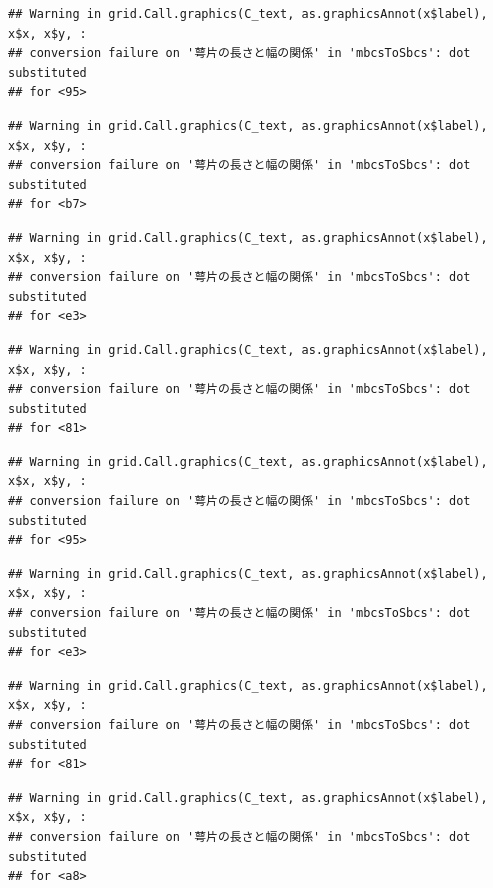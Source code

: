 \documentclass[
]{book}
\begin{document}
\begin{verbatim}
## Warning in grid.Call.graphics(C_text, as.graphicsAnnot(x$label), x$x, x$y, :
## conversion failure on '萼片の長さと幅の関係' in 'mbcsToSbcs': dot substituted
## for <95>
\end{verbatim}

\begin{verbatim}
## Warning in grid.Call.graphics(C_text, as.graphicsAnnot(x$label), x$x, x$y, :
## conversion failure on '萼片の長さと幅の関係' in 'mbcsToSbcs': dot substituted
## for <b7>
\end{verbatim}

\begin{verbatim}
## Warning in grid.Call.graphics(C_text, as.graphicsAnnot(x$label), x$x, x$y, :
## conversion failure on '萼片の長さと幅の関係' in 'mbcsToSbcs': dot substituted
## for <e3>
\end{verbatim}

\begin{verbatim}
## Warning in grid.Call.graphics(C_text, as.graphicsAnnot(x$label), x$x, x$y, :
## conversion failure on '萼片の長さと幅の関係' in 'mbcsToSbcs': dot substituted
## for <81>
\end{verbatim}

\begin{verbatim}
## Warning in grid.Call.graphics(C_text, as.graphicsAnnot(x$label), x$x, x$y, :
## conversion failure on '萼片の長さと幅の関係' in 'mbcsToSbcs': dot substituted
## for <95>
\end{verbatim}

\begin{verbatim}
## Warning in grid.Call.graphics(C_text, as.graphicsAnnot(x$label), x$x, x$y, :
## conversion failure on '萼片の長さと幅の関係' in 'mbcsToSbcs': dot substituted
## for <e3>
\end{verbatim}

\begin{verbatim}
## Warning in grid.Call.graphics(C_text, as.graphicsAnnot(x$label), x$x, x$y, :
## conversion failure on '萼片の長さと幅の関係' in 'mbcsToSbcs': dot substituted
## for <81>
\end{verbatim}

\begin{verbatim}
## Warning in grid.Call.graphics(C_text, as.graphicsAnnot(x$label), x$x, x$y, :
## conversion failure on '萼片の長さと幅の関係' in 'mbcsToSbcs': dot substituted
## for <a8>
\end{verbatim}
\end{document}
